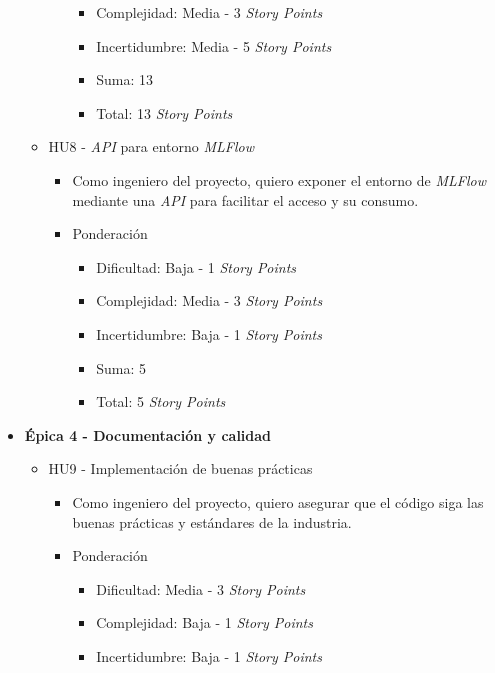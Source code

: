 \documentclass[
11pt, %
]{charter}
\begin{document}
\begin{itemize}
\begin{itemize}
\begin{itemize}
\begin{itemize}
                \item Complejidad: Media - 3 \textit{Story Points}
                \item Incertidumbre: Media - 5 \textit{Story Points}
                \item Suma: 13
                \item Total: 13 \textit{Story Points}
            \end{itemize}
        \end{itemize}
      \item HU8 - \textit{API} para entorno \textit{MLFlow}
        \begin{itemize}
            \item Como ingeniero del proyecto, quiero exponer el entorno de \textit{MLFlow} mediante una \textit{API} para facilitar el acceso y su consumo.
            \item Ponderación
            \begin{itemize}
                \item Dificultad: Baja - 1 \textit{Story Points}
                \item Complejidad: Media - 3 \textit{Story Points}
                \item Incertidumbre: Baja - 1 \textit{Story Points}
                \item Suma: 5
                \item Total: 5 \textit{Story Points}
            \end{itemize}
        \end{itemize}
    \end{itemize}
  \item \textbf{\'{E}pica 4 - Documentación y calidad}
    \begin{itemize}
      \item HU9 - Implementación de buenas prácticas
        \begin{itemize}
            \item Como ingeniero del proyecto, quiero asegurar que el código siga las buenas prácticas y estándares de la industria.
            \item Ponderación
            \begin{itemize}
                \item Dificultad: Media - 3 \textit{Story Points}
                \item Complejidad: Baja - 1 \textit{Story Points}
                \item Incertidumbre: Baja - 1 \textit{Story Points}

\end{itemize}
\end{itemize}
\end{itemize}
\end{itemize}
\end{document}
